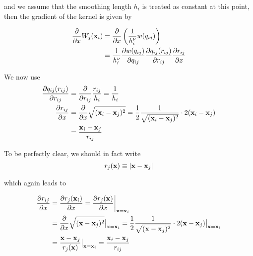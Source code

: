 and we assume that the smoothing length $h_i$ is treated as constant at this point, then the gradient of the kernel is given by

\begin{align}
	\frac{\partial}{\partial x} W_j (\mathbf{x}_i) 	&= \frac{\partial}{\partial x} \left( \frac{1}{h_i^\nu} w ( q_{ij} )	\right)	\nonumber \\
						&= \frac{1}{h_i^\nu} \frac{\partial w(q_{ij})}{\partial q_{ij}} \frac{\partial q_{ij}(r_{ij})}{\partial r_{ij}} \frac{\partial r_{ij}}{\partial x} 	\label{grad_kernel}
\end{align}




We now use
\begin{align}
	\frac{\partial q_{ij}(r_{ij})}{\partial r_{ij}} 	&= \frac{\partial}{\partial r_{ij}} \frac{r_{ij}}{h_i} = \frac{1}{h_i}		\label{dqdr} \\
	\frac{\partial r_{ij}}{\partial x}		&= \frac{\partial}{\partial x} \sqrt{(\mathbf{x}_i - \mathbf{x}_j)^2}
							= \frac{1}{2} \frac{1}{\sqrt{(\mathbf{x}_i - \mathbf{x}_j)^2}} \cdot 2 (\mathbf{x}_i - \mathbf{x}_j) \nonumber \\
						&= \frac{\mathbf{x}_i - \mathbf{x}_j}{r_{ij}} 	\label{drdx}
\end{align}











To be perfectly clear, we should in fact write
\begin{align*}
	r_j(\mathbf{x}) & \equiv | \mathbf{x} - \mathbf{x}_j | \\
\end{align*}

which again leads to

\begin{align*}
	\frac{\partial r_{ij}}{\partial x}		&= \frac{\partial r_j(\mathbf{x}_i)}{\partial x} = \frac{\partial r_j(\mathbf{x})}{\partial x} \bigg{|}_{\mathbf{x} = \mathbf{x}_i} \\
						&= \frac{\partial}{\partial x} \sqrt{(\mathbf{x} - \mathbf{x}_j)^2} \big{|}_{\mathbf{x} = \mathbf{x}_i}
							= \frac{1}{2} \frac{1}{\sqrt{(\mathbf{x} - \mathbf{x}_j)^2}} \cdot 2 (\mathbf{x} - \mathbf{x}_j)  \big{|}_{\mathbf{x} = \mathbf{x}_i} \\
						&= \frac{\mathbf{x} - \mathbf{x}_j}{r_{j}(\mathbf{x})} \big{|}_{\mathbf{x} = \mathbf{x}_i} 
							= \frac{\mathbf{x}_i - \mathbf{x}_j}{r_{ij}}
\end{align*}



















